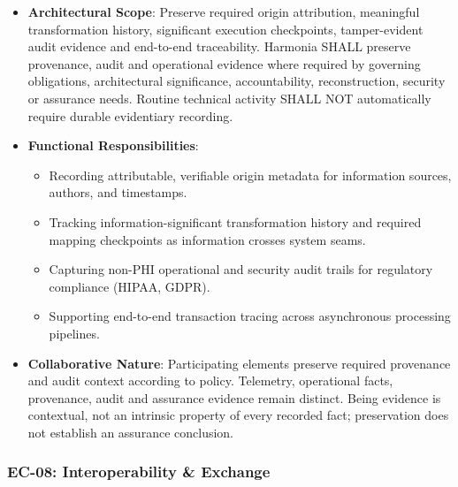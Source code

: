 \begin{itemize}

\item 
\textbf{Architectural Scope}: Preserve required origin attribution, meaningful transformation history, significant execution checkpoints, tamper-evident audit evidence and end-to-end traceability. Harmonia SHALL preserve provenance, audit and operational evidence where required by governing obligations, architectural significance, accountability, reconstruction, security or assurance needs. Routine technical activity SHALL NOT automatically require durable evidentiary recording.



\item 
\textbf{Functional Responsibilities}:


\begin{itemize}

\item 
Recording attributable, verifiable origin metadata for information sources, authors, and timestamps.



\item 
Tracking information-significant transformation history and required mapping checkpoints as information crosses system seams.



\item 
Capturing non-PHI operational and security audit trails for regulatory compliance (HIPAA, GDPR).



\item 
Supporting end-to-end transaction tracing across asynchronous processing pipelines.



\end{itemize}


\item 
\textbf{Collaborative Nature}: Participating elements preserve required provenance and audit context according to policy. Telemetry, operational facts, provenance, audit and assurance evidence remain distinct. Being evidence is contextual, not an intrinsic property of every recorded fact; preservation does not establish an assurance conclusion.



\end{itemize}
\label{rad:enterprise:166}
\subsubsection*{EC-08: Interoperability \& Exchange}
\label{rad:enterprise:167}

